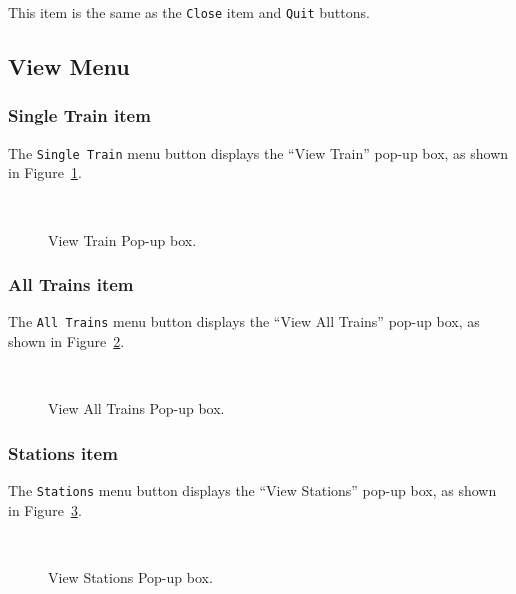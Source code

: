 This item is the same as the {\tt Close} item and {\tt Quit} buttons.

\subsection{View Menu}

\subsubsection{Single Train item}

The {\tt Single Train} menu button displays the ``View Train'' pop-up
box, as shown in Figure~\ref{fig:viewSingleTrainPopup}.

\begin{figure}
\begin{centering}
\\
\caption{View Train Pop-up box.}
\label{fig:viewSingleTrainPopup}
\end{centering}
\end{figure}   

\subsubsection{All Trains item}

The {\tt All Trains} menu button displays the ``View All Trains'' pop-up
box, as shown in Figure~\ref{fig:viewAllTrainsPopup}. 

\begin{figure}
\begin{centering}
\\
\caption{View All Trains Pop-up box.}
\label{fig:viewAllTrainsPopup}
\end{centering}
\end{figure}   

\subsubsection{Stations item}

The {\tt Stations} menu button displays the ``View Stations'' pop-up box,
as shown in Figure~\ref{fig:viewStations}.

\begin{figure}
\begin{centering}
\\
\caption{View Stations Pop-up box.}
\label{fig:viewStations}
\end{centering}
\end{figure}   


